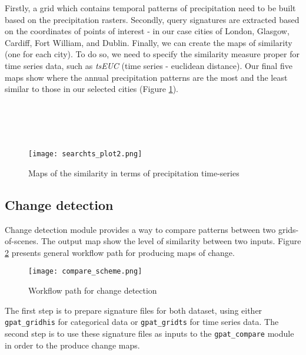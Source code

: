 Firstly, a grid which contains temporal patterns of precipitation need to be built based on the precipitation rasters.
Secondly, query signatures are extracted based on the coordinates of points of interest - in our case cities of London, Glasgow, Cardiff, Fort William, and Dublin. Finally, we can create the maps of similarity (one for each city). 
To do so, we need to specify the similarity measure proper for time series data, such as {\it tsEUC} (time series - euclidean distance).
Our final five maps show where the annual precipitation patterns are the most and the least similar to those in our selected cities (Figure \ref{FIG:SEARCHTS2}). \\\\\\\\\\

\begin{figure}[H]
        \begin{center}
	\texttt{[image: searchts\_plot2.png]}
	\caption{Maps of the similarity in terms of precipitation time-series}
	\label{FIG:SEARCHTS2}
        \end{center}
\end{figure}

\FloatBarrier

\subsection{Change detection}

Change detection module provides a way to compare patterns between two grids-of-scenes.
The output map show the level of similarity between two inputs.
Figure \ref{FIG:CHANGE} presents general workflow path for producing maps of change. 

\begin{figure}[H]
	\centering
	\texttt{[image: compare\_scheme.png]}
	\caption{Workflow path for change detection}
	\label{FIG:CHANGE}
\end{figure}

The first step is to prepare signature files for both dataset, using either {\tt gpat\_gridhis} for categorical data or {\tt gpat\_gridts} for time series data.
The second step is to use these signature files as inputs to the {\tt gpat\_compare} module in order to the produce change maps. \\\\

